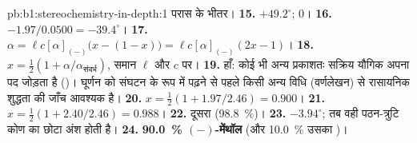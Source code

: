 \begin{solution}{pb:b1:stereochemistry-in-depth:1}
परास के भीतर।
\textbf{15.} $+49.2^\circ$; $0$।
\textbf{16.} $-1.97/0.0500 = -39.4^\circ$।
\textbf{17.} $\alpha = \ell c[\alpha]_{(-)}\bigl(x - (1 - x)\bigr) =
\ell c[\alpha]_{(-)}(2x - 1)$।
\textbf{18.} $x = \frac12(1 + \alpha/\alpha_{\text{संदर्भ}})$, समान $\ell$ और $c$ पर।
\textbf{19.} हाँ: कोई भी अन्य प्रकाशतः सक्रिय यौगिक अपना पद जोड़ता है
()। घूर्णन को संघटन के रूप में पढ़ने से पहले किसी अन्य विधि
(वर्णलेखन) से रासायनिक शुद्धता की जाँच आवश्यक है।
\textbf{20.} $x = \frac12(1 + 1.97/2.46) = 0.900$।
\textbf{21.} $x = \frac12(1 + 2.40/2.46) = 0.988$।
\textbf{22.} दूसरा (\qty{98.8}{\percent})।
\textbf{23.} $-3.94^\circ$; तब वही पठन-त्रुटि कोण का छोटा
अंश होती है।
\textbf{24.} \textbf{\qty{90.0}{\percent} $(-)$-मेंथॉल} (और
\qty{10.0}{\percent} उसका )।
\end{solution}
